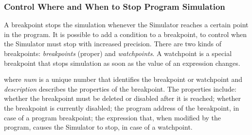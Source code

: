 \documentclass[a4paper,twoside]{tceusermanual}
\begin{document}
\subsubsection{Control Where and When to Stop Program Simulation}
\label{ssec:debug-breakpoints}

A breakpoint stops the simulation whenever the Simulator reaches a certain
point in the program. It is possible to add a condition to a breakpoint, to
control when the Simulator must stop with increased precision. There are two
kinds of breakpoints: \emph{breakpoints} (proper) and \emph{watchpoints}. A
watchpoint is a special breakpoint that stops simulation as soon as the
value of an expression changes.

%
where \emph{num} is a unique number that identifies the breakpoint or
watchpoint and \emph{description} describes the properties of the
breakpoint. The properties include: whether the breakpoint must be deleted
or disabled after it is reached; whether the breakpoint is currently
disabled; the program address of the breakpoint, in case of a program
breakpoint; the expression that, when modified by the program, causes the
Simulator to stop, in case of a watchpoint.
\end{document}
